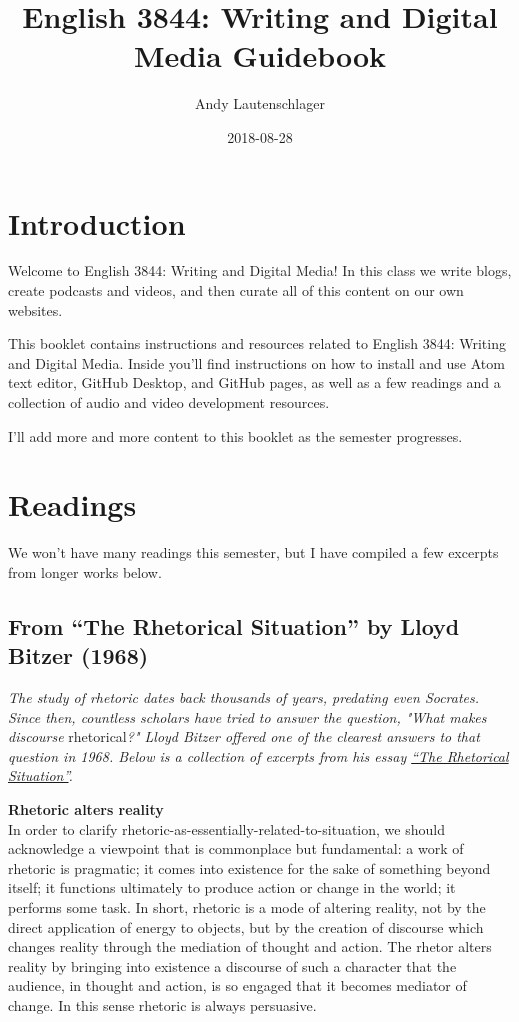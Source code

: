 \documentclass[]{book}
\title{English 3844: Writing and Digital Media Guidebook}
\author{Andy Lautenschlager}
\date{2018-08-28}
\theoremstyle{definition}
\theoremstyle{definition}
\theoremstyle{definition}
\theoremstyle{remark}
\begin{document}
\maketitle

{
\setcounter{tocdepth}{1}
\tableofcontents
}
\hypertarget{introduction}{%
\chapter{Introduction}\label{introduction}}

Welcome to English 3844: Writing and Digital Media! In this class we
write blogs, create podcasts and videos, and then curate all of this
content on our own websites.

This booklet contains instructions and resources related to English
3844: Writing and Digital Media. Inside you'll find instructions on how
to install and use Atom text editor, GitHub Desktop, and GitHub pages,
as well as a few readings and a collection of audio and video
development resources.

I'll add more and more content to this booklet as the semester
progresses.

\hypertarget{readings}{%
\chapter{Readings}\label{readings}}

We won't have many readings this semester, but I have compiled a few
excerpts from longer works below.

\hypertarget{from-the-rhetorical-situation-by-lloyd-bitzer-1968}{%
\section{From ``The Rhetorical Situation'' by Lloyd Bitzer
(1968)}\label{from-the-rhetorical-situation-by-lloyd-bitzer-1968}}

\emph{The study of rhetoric dates back thousands of years, predating
even Socrates. Since then, countless scholars have tried to answer the
question, "What makes discourse} rhetorical\emph{?" Lloyd Bitzer offered
one of the clearest answers to that question in 1968. Below is a
collection of excerpts from his essay
\href{http://www.arts.uwaterloo.ca/~raha/309CWeb/Bitzer(1968).pdf}{``The
Rhetorical Situation''}.}

\textbf{Rhetoric alters reality}\\
In order to clarify rhetoric-as-essentially-related-to-situation, we
should acknowledge a viewpoint that is commonplace but fundamental: a
work of rhetoric is pragmatic; it comes into existence for the sake of
something beyond itself; it functions ultimately to produce action or
change in the world; it performs some task. In short, rhetoric is a mode
of altering reality, not by the direct application of energy to objects,
but by the creation of discourse which changes reality through the
mediation of thought and action. The rhetor alters reality by bringing
into existence a discourse of such a character that the audience, in
thought and action, is so engaged that it becomes mediator of change. In
this sense rhetoric is always persuasive.
\end{document}
